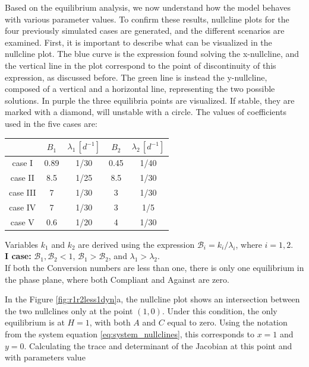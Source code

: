 Based on the equilibrium analysis, we now understand how the model behaves with various parameter values. To confirm these results, nullcline plots for the four previously simulated cases are generated, and the different scenarios are examined. First, it is important to describe what can be visualized in the nullcline plot. The blue curve is the expression found solving the x-nullcline, and the vertical line in the plot correspond to the point of discontinuity of this expression, as discussed before. The green line is instead the y-nullcline, composed of a vertical and a horizontal line, representing the two possible solutions. In purple the three equilibria points are visualized. If stable, they are marked with a diamond, will unstable with a circle.  
The values of coefficients used in the five cases are:
\begin{center}
 \begin{tabular}{|c|c|c|c|c|}
 	\hline
 	& $B_1$ & $\lambda_1 \,[d^{-1}]$ & $B_2$ & $\lambda_2 \, [d^{-1}]$ \\
 	\hline
 	case I & 0.89 & 1/30 & 0.45 & 1/40 \\
 	\hline
 	case II & 8.5 & 1/25 & 8.5 & 1/30 \\
 	\hline
 	case III & 7 & 1/30 & 3 & 1/30 \\
 	\hline
 	case IV & 7 & 1/30 & 3 & 1/5 \\
 	\hline
 	case V & 0.6 & 1/20 & 4& 1/30 \\  
 	\hline
 \end{tabular}
\end{center}
Variables $k_1$ and $k_2$ are derived using the expression $\mathcal{B}_i = k_i/\lambda_i$, where $i = 1, 2$.\\

\noindent\textbf{I case: }$\mathcal{B}_1, \mathcal{B}_2 <1$, $\mathcal{B}_1 >  \mathcal{B}_2$, and $\lambda_1 > \lambda_2$. \\
If both the Conversion numbers are less than one, there is only one equilibrium in the phase plane, where both Compliant and Against are zero.

In the Figure \ref{fig:r1r2less1dyn}a, the nullcline plot shows an intersection between the two nullclines only at the point $(1,0)$. Under this condition, the only equilibrium is at $H = 1$, with both $A$ and $C$ equal to zero. Using the notation from the system equation \eqref{eq:system_nullclines}, this corresponds to $x = 1$ and $y = 0$. Calculating the trace and determinant of the Jacobian at this point and with parameters value


